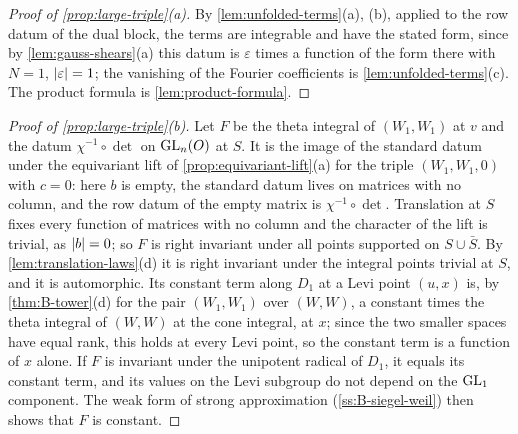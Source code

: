\begin{proof}[Proof of \cref{prop:large-triple}(a)]
By \cref{lem:unfolded-terms}(a), (b), applied to the row datum of the dual block, the terms are integrable and have the stated form, since by \cref{lem:gauss-shears}(a) this datum is
$\varepsilon$ times a function of the form there with $N=1$, $\lvert \varepsilon\rvert=1$; the vanishing of the Fourier coefficients is \cref{lem:unfolded-terms}(c). The product formula is \cref{lem:product-formula}.
\end{proof}

\begin{proof}[Proof of \cref{prop:large-triple}(b)]
Let $F$ be the theta integral of $(W_1,W_1)$ at $v$ and the datum $\chi^{-1}\circ\det$ on $\operatorname{GL}_n(O)$ at $S$. It is the image of the standard datum under the equivariant lift of
\cref{prop:equivariant-lift}(a) for the triple $(W_1,W_1,0)$ with $c=0$: here $b$ is empty, the standard datum lives on matrices with no column, and the row datum of the empty matrix is $\chi^{-1}\circ\det$.
Translation at $S$ fixes every function of matrices with no column and the character of the lift is trivial, as $\lvert b\rvert=0$; so $F$ is right invariant under all points supported on $S\cup\bar S$. By
\cref{lem:translation-laws}(d) it is right invariant under the integral points trivial at $S$, and it is automorphic. Its constant term along $D_1$ at a Levi point $(u,x)$ is, by \cref{thm:B-tower}(d) for the
pair $(W_1,W_1)$ over $(W,W)$, a constant times the theta integral of $(W,W)$ at the cone integral, at $x$; since the two smaller spaces have equal rank, this holds at every Levi point, so the constant term is a
function of $x$ alone. If $F$ is invariant under the unipotent radical of $D_1$, it equals its constant term, and its values on the Levi subgroup do not depend on the $\operatorname{GL}_1$ component. The weak form of strong
approximation (\cref{ss:B-siegel-weil}) then shows that $F$ is constant.
\end{proof}

